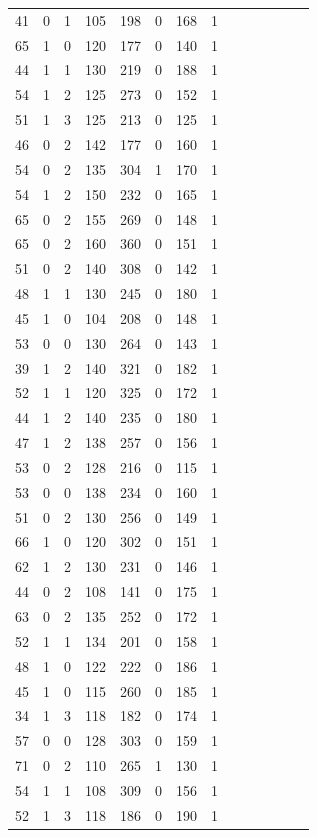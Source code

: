 \documentclass{article}
\begin{document}
\begin{longtable}{|c|c|c|c|c|c|c|c|c|c|c|c|c|c|}
41 & 0 & 1 & 105 & 198 & 0 & 168 & 1\\
65 & 1 & 0 & 120 & 177 & 0 & 140 & 1\\
44 & 1 & 1 & 130 & 219 & 0 & 188 & 1\\
54 & 1 & 2 & 125 & 273 & 0 & 152 & 1\\
51 & 1 & 3 & 125 & 213 & 0 & 125 & 1\\
46 & 0 & 2 & 142 & 177 & 0 & 160 & 1\\
54 & 0 & 2 & 135 & 304 & 1 & 170 & 1\\
54 & 1 & 2 & 150 & 232 & 0 & 165 & 1\\
65 & 0 & 2 & 155 & 269 & 0 & 148 & 1\\
65 & 0 & 2 & 160 & 360 & 0 & 151 & 1\\
51 & 0 & 2 & 140 & 308 & 0 & 142 & 1\\
48 & 1 & 1 & 130 & 245 & 0 & 180 & 1\\
45 & 1 & 0 & 104 & 208 & 0 & 148 & 1\\
53 & 0 & 0 & 130 & 264 & 0 & 143 & 1\\
39 & 1 & 2 & 140 & 321 & 0 & 182 & 1\\
52 & 1 & 1 & 120 & 325 & 0 & 172 & 1\\
44 & 1 & 2 & 140 & 235 & 0 & 180 & 1\\
47 & 1 & 2 & 138 & 257 & 0 & 156 & 1\\
53 & 0 & 2 & 128 & 216 & 0 & 115 & 1\\
53 & 0 & 0 & 138 & 234 & 0 & 160 & 1\\
51 & 0 & 2 & 130 & 256 & 0 & 149 & 1\\
66 & 1 & 0 & 120 & 302 & 0 & 151 & 1\\
62 & 1 & 2 & 130 & 231 & 0 & 146 & 1\\
44 & 0 & 2 & 108 & 141 & 0 & 175 & 1\\
63 & 0 & 2 & 135 & 252 & 0 & 172 & 1\\
52 & 1 & 1 & 134 & 201 & 0 & 158 & 1\\
48 & 1 & 0 & 122 & 222 & 0 & 186 & 1\\
45 & 1 & 0 & 115 & 260 & 0 & 185 & 1\\
34 & 1 & 3 & 118 & 182 & 0 & 174 & 1\\
57 & 0 & 0 & 128 & 303 & 0 & 159 & 1\\
71 & 0 & 2 & 110 & 265 & 1 & 130 & 1\\
54 & 1 & 1 & 108 & 309 & 0 & 156 & 1\\
52 & 1 & 3 & 118 & 186 & 0 & 190 & 1\\

\end{longtable}
\end{document}
